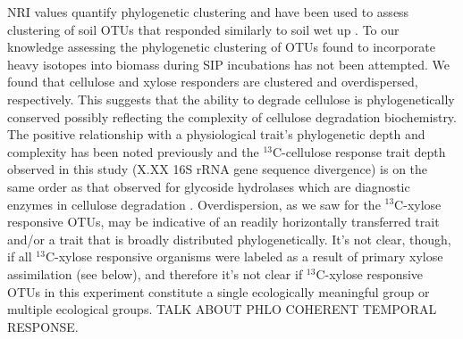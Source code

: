 NRI values quantify phylogenetic clustering \citep{Webb2000} and have 
been used to assess clustering of soil OTUs that responded similarly to soil
wet up \citep{Evans2014a,Placella2012}. To our knowledge assessing the
phylogenetic clustering of OTUs found to incorporate heavy isotopes into
biomass during SIP incubations has not been attempted. We found that cellulose
and xylose responders are clustered and overdispersed, respectively. This
suggests that the ability to degrade cellulose is phylogenetically conserved
possibly reflecting the complexity of cellulose degradation biochemistry. The
positive relationship with a physiological trait's phylogenetic depth and
complexity has been noted previously \citep{Martiny2013a} and the
$^{13}$C-cellulose response trait depth observed in this study (X.XX 16S rRNA
gene sequence divergence) is on the same order as that observed for glycoside
hydrolases which are diagnostic enzymes in cellulose degradation
\citep{Berlemont2013}. Overdispersion, as we saw for the $^{13}$C-xylose
responsive OTUs, may be indicative of an readily horizontally transferred trait
and/or a trait that is broadly distributed phylogenetically. It's not clear,
though, if all $^{13}$C-xylose responsive organisms were labeled as a result of
primary xylose assimilation (see below), and therefore it's not clear if
$^{13}$C-xylose responsive OTUs in this experiment constitute a single
ecologically meaningful group or multiple ecological groups. TALK ABOUT PHLO
COHERENT TEMPORAL RESPONSE.

